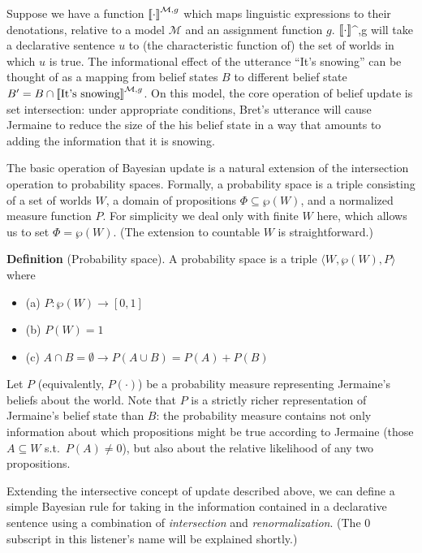 \documentclass[12pt]{article}
\newcommand{\llbracket}{\ensuremath{\left [\!\left [}}%
\newcommand{\rrbracket}{\ensuremath{\right ]\!\right ]}}
\providecommand{\sv}[1]{\ensuremath{\llbracket #1 \rrbracket}}
\newcommand{\bei}{\begin{itemize}}
\newcommand{\eni}{\end{itemize}}
\newcommand{\lar}[1]{\ensuremath{\langle #1 \rangle}}
\newcounter{definition}
\newcommand{\defin}[2]{
\vspace{.1in}
\noindent \textbf{Definition \arabic{definition}} (#1). #2
\vspace{.1in}
\addtocounter{definition}{1}
}
\begin{document}
Suppose we have a function $\sv{\cdot}^{\mathcal{M},g}$ which maps linguistic expressions to their denotations, relative to a model $\mathcal{M}$ and an assignment function $g$. \sv{\cdot}^{,g} will take a declarative sentence $u$ to (the characteristic function of) the set of worlds in which $u$ is true. The informational effect of the utterance ``It's snowing'' can be thought of as a mapping from belief states $B$ to different belief state $B' = B \cap \sv{\text{It's snowing}}^{\mathcal{M},g}$. On this model, the core operation of belief update is set intersection: under appropriate conditions, Bret's utterance will cause Jermaine to reduce the size of the his belief state in a way that amounts to adding the information that it is snowing. 

The basic operation of Bayesian update is a natural extension of the intersection operation to probability spaces. Formally, a probability space is a triple consisting of a set of worlds $W$, a domain of propositions $\Phi \subseteq \wp(W)$, and a normalized measure function $P$. For simplicity we deal only with finite $W$ here, which allows us to set $\Phi = \wp(W)$. (The extension to countable $W$ is straightforward.)

\defin{Probability space}{A probability space is a triple \lar{W, \wp(W), P} where
\bei
\item [(a)] $P: \wp(W) \rightarrow [0,1]$
\item [(b)] $P(W) = 1$
\item [(c)] $A \cap B = \emptyset \rightarrow P(A \cup B) = P(A) + P(B)$
\eni
}
Let $P$ (equivalently, $P(\cdot)$) be a probability measure representing Jermaine's beliefs about the world. Note that $P$ is a strictly richer representation of Jermaine's belief state than $B$: the probability measure contains not only information about which propositions might be true according to Jermaine (those $A \subseteq W$ s.t.\ $P(A) \neq 0$), but also about the relative likelihood of any two propositions. 

Extending the intersective concept of update described above, we can define a simple Bayesian rule for taking in the information contained in a declarative sentence using a combination of \emph{intersection} and \emph{renormalization}. (The 0 subscript in this listener's name will be explained shortly.) 
\end{document}
